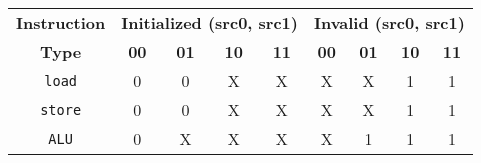 

\begin{tabular}{|c||c|c|c|c||c|c|c|c|}
\hline

{\bf Instruction} & \multicolumn{4}{c|}{\bf Initialized (src0, src1)} & \multicolumn{4}{c|}{\bf Invalid (src0, src1)} \\ \cline{2-9}
{\bf Type} & {\bf 00} & {\bf 01} & {\bf 10} & {\bf 11} & {\bf 00} & {\bf 01} & {\bf 10} & {\bf 11} \\ \hline

{\tt load} & 0 & 0 & X & X & X & X & 1 & 1 \\ \hline
{\tt store} & 0 & 0 & X & X & X & X & 1 & 1 \\ \hline
{\tt ALU} & 0 & X & X & X & X & 1 & 1 & 1 \\ \hline

\end{tabular}
